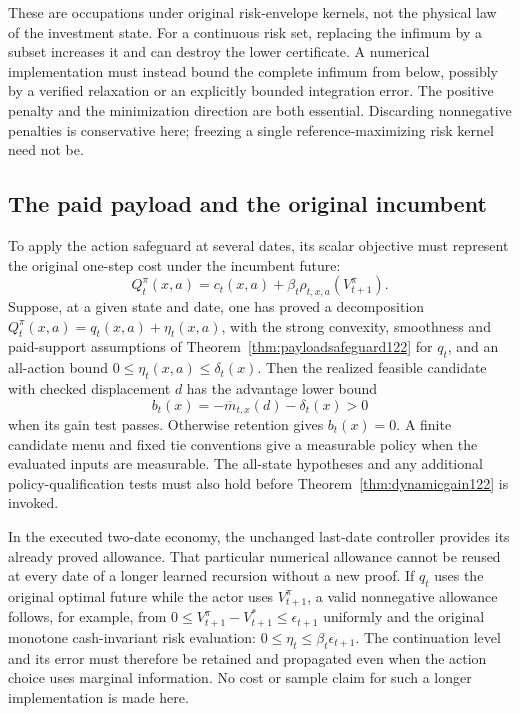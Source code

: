 These are occupations under original risk-envelope kernels, not the
physical law of the investment state. For a continuous risk set, replacing
the infimum by a subset increases it and can destroy the lower certificate.
A numerical implementation must instead bound the complete infimum from
below, possibly by a verified relaxation or an explicitly bounded
integration error. The positive penalty and the minimization direction
are both essential. Discarding nonnegative penalties is conservative
here; freezing a single reference-maximizing risk kernel need not be.

\subsection{The paid payload and the original incumbent}

To apply the action safeguard at several dates, its scalar objective must
represent the original one-step cost under the incumbent future:
\[
 Q_t^\pi(x,a)=c_t(x,a)+\beta_t\rho_{t,x,a}(V_{t+1}^\pi).
\]
Suppose, at a given state and date, one has proved a decomposition
$Q_t^\pi(x,a)=q_t(x,a)+\eta_t(x,a)$, with the strong convexity,
smoothness and paid-support assumptions of
Theorem~\ref{thm:payloadsafeguard122} for $q_t$, and an all-action bound
$0\le\eta_t(x,a)\le\delta_t(x)$. Then the realized feasible candidate
with checked displacement $d$ has the advantage lower bound
\[
 b_t(x)= -\overline m_{t,x}(d)-\delta_t(x)>0
\]
when its gain test passes. Otherwise retention gives $b_t(x)=0$.
A finite candidate menu and fixed tie conventions give a measurable
policy when the evaluated inputs are measurable. The all-state hypotheses
and any additional policy-qualification tests must also hold before
Theorem~\ref{thm:dynamicgain122} is invoked.

In the executed two-date economy, the unchanged last-date controller
provides its already proved allowance. That particular numerical allowance
cannot be reused at every date of a longer learned recursion without a
new proof. If $q_t$ uses the original optimal future while the actor uses
$V_{t+1}^\pi$, a valid nonnegative allowance follows, for example, from
$0\le V_{t+1}^\pi-V_{t+1}^*\le\epsilon_{t+1}$ uniformly and the original
monotone cash-invariant risk evaluation:
$0\le\eta_t\le\beta_t\epsilon_{t+1}$.
The continuation level and its error must therefore be retained and
propagated even when the action choice uses marginal information.
No cost or sample claim for such a longer implementation is made here.

